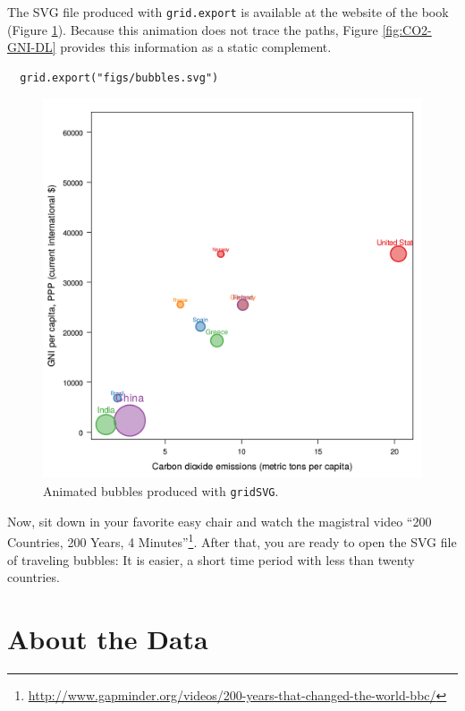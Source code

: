 \documentclass[smallroyalvopaper]{memoir}
\begin{document}
The SVG file produced with \texttt{grid.export} is available at the website
of the book (Figure \ref{fig:bubblesSVG}). Because this animation does
not trace the paths, Figure \ref{fig:CO2-GNI-DL} provides this
information as a static complement.


\lstset{language=r,label= ,caption= ,captionpos=b,numbers=none}
\begin{lstlisting}
  grid.export("figs/bubbles.svg")
\end{lstlisting}

\begin{figure}
  \centering
  \includegraphics[width=\textwidth]{figs/bubbles.png}
  \caption{Animated bubbles produced with \texttt{gridSVG}.}
  \label{fig:bubblesSVG}
\end{figure}

Now, sit down in your favorite easy chair and watch the magistral
video ``200 Countries, 200 Years, 4 Minutes''\footnote{\url{http://www.gapminder.org/videos/200-years-that-changed-the-world-bbc/}}. After that, you are
ready to open the SVG file of traveling bubbles: It is easier, a short
time period with less than twenty countries.

\chapter{About the Data}
\label{sec:org7d9a127}
\label{cha:dataTime}
\end{document}
